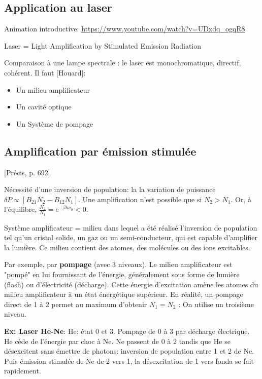 \documentclass[11pt]{report}
\numberwithin{figure}{section}
\numberwithin{equation}{section}
\numberwithin{table}{section}
\newcommand{\e}{\mathrm{e}}
\newcommand{\1}{\boldsymbol{1}}
\begin{document}
\subsection{Application au laser}

Animation introductive: \url{https://www.youtube.com/watch?v=UDxdq_ogqR8}

Laser = Light Amplification by Stimulated Emission Radiation

Comparaison à une lampe spectrale : le laser est monochromatique, directif, cohérent. Il faut [Houard]:
\begin{itemize}
\item Un milieu amplificateur
\item Un cavité optique
\item Un Système de pompage
\end{itemize}

\subsection{Amplification par émission stimulée}

[Précis, p. 692]

Nécessité d'une inversion de population: la la variation de puissance $\delta P \propto [B_{21} N_2 - B_{12} N_1]$. Une amplification n'est possible que si $N_2 > N_1$. Or, à l'équilibre, $\frac{N_2}{N_1} = \e^{- \beta h \nu_0} < 0$.

Système amplificateur = milieu dans lequel a été réalisé l'inversion de population tel qu'un cristal solide, un gaz ou un semi-conducteur, qui est capable d'amplifier la lumière. Ce milieu contient des atomes, des molécules ou des ions excitables. 


Par exemple, par \textbf{pompage} (avec 3 niveaux). Le milieu amplificateur est "pompé" en lui fournissant de l'énergie, généralement sous forme de lumière (flash) ou d'électricité (décharge). Cette énergie d'excitation amène les atomes du milieu amplificateur à un état énergétique supérieur. En réalité, un pompage direct de   1 à 2 permet au maximum d'obtenir $N_1 = N_2$ : On utilise un troisième niveau.

\textbf{Ex: Laser He-Ne}: He: état 0 et 3. Pompage de 0 à 3 par décharge électrique. He cède de l'énergie par choc à Ne. Ne passent de 0 à 2 tandis que He se désexcitent sans émettre de photons: inversion de population entre 1 et 2 de Ne.  Puis émission stimulée de Ne de 2 vers 1, la désexcitation de 1 vers fonda se fait rapidement.
\end{document}
